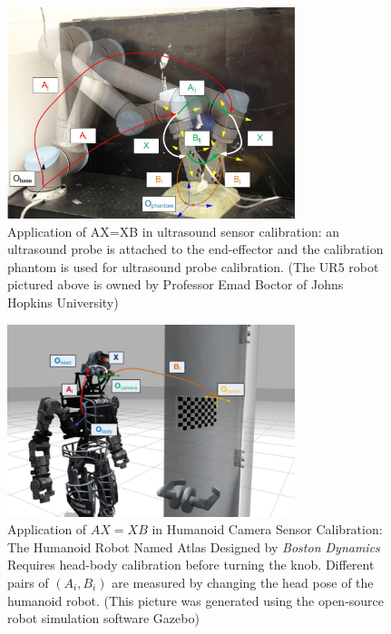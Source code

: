 \documentclass[twocolumn,10pt]{asme2ej}
\begin{document}
\begin{figure}[t!]
\centering
\includegraphics[width=3.3in]{Photos/UR5_Frame_Final.jpg}
\caption{Application of AX=XB in ultrasound sensor calibration: an ultrasound probe is attached to the end-effector and the calibration phantom is used for ultrasound probe calibration. (The UR5 robot pictured above is owned by Professor Emad Boctor of Johns Hopkins University)}
\label{AXXBfig2}
\end{figure}

\begin{figure}[t!]
\centering
\includegraphics[width=3.3in]{Photos/Atlas_Humanoid.png}
\caption{Application of $AX=XB$ in Humanoid Camera Sensor Calibration: The Humanoid Robot Named Atlas Designed by
 \textit{Boston Dynamics} Requires head-body calibration before turning the knob. Different pairs of $(A_i, B_i)$ are measured by changing the head pose of the humanoid robot. (This picture was generated using the open-source robot simulation software Gazebo)}
\label{AXXBfig3}
\end{figure}
\end{document}
